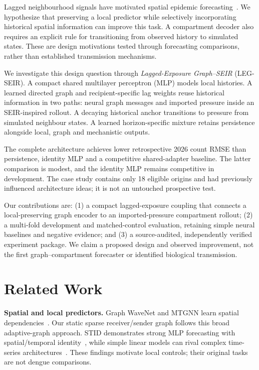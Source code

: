 \documentclass[conference]{IEEEtran}
\begin{document}
Lagged neighbourhood signals have motivated spatial epidemic forecasting~\cite{liucao2026,epignn2022}. We hypothesize that preserving a local predictor while selectively incorporating historical spatial information can improve this task. A compartment decoder also requires an explicit rule for transitioning from observed history to simulated states. These are design motivations tested through forecasting comparisons, rather than established transmission mechanisms.

We investigate this design question through \emph{Lagged-Exposure Graph--SEIR} (LEG-SEIR). A compact shared multilayer perceptron (MLP) models local histories. A learned directed graph and recipient-specific lag weights reuse historical information in two paths: neural graph messages and imported pressure inside an SEIR-inspired rollout. A decaying historical anchor transitions to pressure from simulated neighbour states. A learned horizon-specific mixture retains persistence alongside local, graph and mechanistic outputs.

The complete architecture achieves lower retrospective 2026 count RMSE than persistence, identity MLP and a competitive shared-adapter baseline. The latter comparison is modest, and the identity MLP remains competitive in development. The case study contains only 18 eligible origins and had previously influenced architecture ideas; it is not an untouched prospective test.

Our contributions are: (1) a compact lagged-exposure coupling that connects a local-preserving graph encoder to an imported-pressure compartment rollout; (2) a multi-fold development and matched-control evaluation, retaining simple neural baselines and negative evidence; and (3) a source-audited, independently verified experiment package. We claim a proposed design and observed improvement, not the first graph--compartment forecaster or identified biological transmission.

\section{Related Work}
\textbf{Spatial and local predictors.} Graph WaveNet and MTGNN learn spatial dependencies~\cite{wu2019graphwavenet,mtgnn2020}. Our static sparse receiver/sender graph follows this broad adaptive-graph approach. STID demonstrates strong MLP forecasting with spatial/temporal identity~\cite{stid2022}, while simple linear models can rival complex time-series architectures~\cite{zeng2023nlinear}. These findings motivate local controls; their original tasks are not dengue comparisons.
\end{document}
